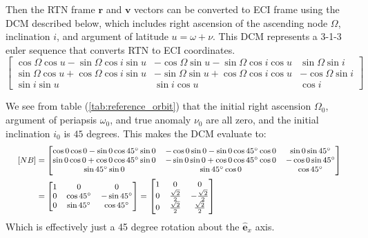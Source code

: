 \documentclass[titlepage]{article}
\begin{document}
Then the RTN frame $\boldsymbol{r}$ and $\boldsymbol{v}$ vectors can be converted to ECI frame using the DCM described below, which includes right ascension of the ascending node $\Omega$, inclination $i$, and argument of latitude $u=\omega+\nu$. This DCM represents a 3-1-3 euler sequence that converts RTN to ECI coordinates.
\begin{equation}
	\left[
	\begin{matrix}
		\cos{\Omega}\cos{u}-\sin{\Omega}\cos{i}\sin{u} & -\cos{\Omega}\sin{u}-\sin{\Omega}\cos{i}\cos{u} & \sin{\Omega}\sin{i}\\
		\sin{\Omega}\cos{u}+\cos{\Omega}\cos{i}\sin{u} & -\sin{\Omega}\sin{u}+\cos{\Omega}\cos{i}\cos{u} & -\cos{\Omega}\sin{i}\\
		\sin{i}\sin{u} & \sin{i}\cos{u} & \cos{i}
	\end{matrix}
	\right]
\end{equation}

We see from table (\ref*{tab:reference_orbit}) that the initial right ascension $\Omega_0$, argument of periapsis $\omega_0$, and true anomaly $\nu_0$ are all zero, and the initial inclination $i_0$ is $45$ degrees. This makes the DCM evaluate to:
\begin{equation}
	\footnotesize
	\begin{split}
		[NB]&=
		\begin{bmatrix}
			\cos{0}\cos{0}-\sin{0}\cos{45^\circ}\sin{0} & -\cos{0}\sin{0}-\sin{0}\cos{45^\circ}\cos{0} & \sin{0}\sin{45^\circ}\\
			\sin{0}\cos{0}+\cos{0}\cos{45^\circ}\sin{0} & -\sin{0}\sin{0}+\cos{0}\cos{45^\circ}\cos{0} & -\cos{0}\sin{45^\circ}\\
			\sin{45^\circ}\sin{0} & \sin{45^\circ}\cos{0} & \cos{45^\circ}
		\end{bmatrix} \\
		&=
		\begin{bmatrix}
			1 & 0 & 0 \\
			0 & \cos 45^\circ & -\sin 45^\circ \\
			0 & \sin 45^\circ & \cos 45^\circ
		\end{bmatrix}
		=
		\begin{bmatrix}
			1 & 0 & 0 \\
			0 & \frac{\sqrt{2}}{2} & -\frac{\sqrt{2}}{2} \\
			0 & \frac{\sqrt{2}}{2} & \frac{\sqrt{2}}{2}
		\end{bmatrix}
	\end{split}
	\normalsize
\end{equation}
Which is effectively just a 45 degree rotation about the $\hat{\boldsymbol{e}}_x$ axis.\\
\end{document}
